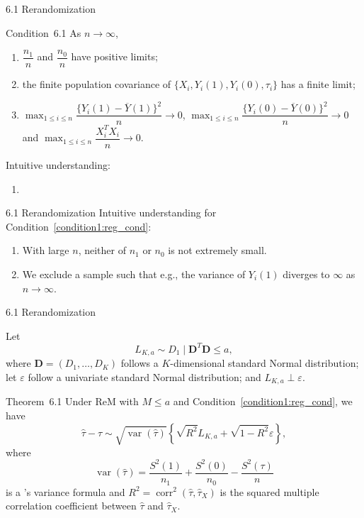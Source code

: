 \documentclass[aspectratio=169, 12pt]{beamer}
\begin{document}
\begin{frame}{6.1 Rerandomization}
  \begin{keybox}{Condition~6.1}
    As $n\to \infty$,
    \begin{enumerate}
      \item $\dfrac{n_1}{n}$ and $\dfrac{n_0}{n}$ have positive limits;
      \item the finite population covariance of $\{X_i, Y_i(1), Y_i(0), \tau_i\}$ has a finite limit;
      \item $\max_{1\leq i \leq n}\dfrac{\{Y_i(1)-\overline{Y}(1)\}^2}{n}\to 0$, $\max_{1\leq i\leq n}\dfrac{\{Y_i(0)-\overline{Y}(0)\}^2}{n}\to 0$ and $\max_{1 \leq i \leq n}\dfrac{X_i^TX_i}{n}\to 0$.
    \end{enumerate}
    \label{condition1:reg_cond}
  \end{keybox}
  Intuitive understanding:
  \begin{enumerate}
    \item 
  \end{enumerate}
\end{frame}

\begin{frame}{6.1 Rerandomization}
  Intuitive understanding for Condition~\ref{condition1:reg_cond}:
  \begin{enumerate}
    \item With large $n$, neither of $n_1$ or $n_0$ is not extremely small.
    \item We exclude a sample such that e.g., the variance of $Y_i(1)$ diverges to $\infty$ as $n\to\infty$.
  \end{enumerate}
\end{frame}

\begin{frame}{6.1 Rerandomization}
  
  Let 
  \[
  L_{K,a}\sim D_1 \mid \bm{D}^T\bm{D} \leq a,
  \]
  where $\bm{D}=(D_1,\dots,D_K)$ follows a $K$-dimensional standard Normal distribution; let $\varepsilon$ follow a univariate standard Normal distribution; and $L_{K,a}\perp \varepsilon$.  
  \begin{keybox}{Theorem~6.1}
    Under ReM with $M\leq a$ and Condition~\ref{condition1:reg_cond}, we have
    \[
    \widehat{\tau}-\tau \sim \sqrt{\operatorname{var}(\widehat{\tau})}\left\{\sqrt{R^2}L_{K,a}+\sqrt{1-R^2}\varepsilon\right\},
    \]
    where 
    \[
    \operatorname{var}(\widehat{\tau}) = \frac{S^2(1)}{n_1}+\frac{S^2(0)}{n_0} - \frac{S^2(\tau)}{n}
    \]
    is a \citet{neyman1923application}'s variance formula and $R^2=\operatorname{corr}^2(\widehat{\tau},\widehat{\tau}_X)$ is the squared multiple correlation coefficient between $\widehat{\tau}$ and $\widehat{\tau}_X$. 
  \end{keybox}
\end{frame}
\end{document}
